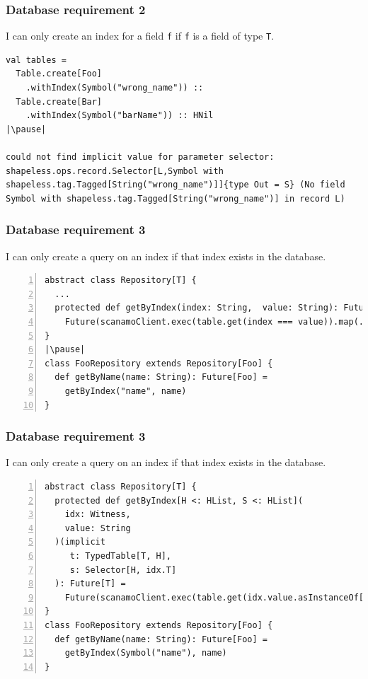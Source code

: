 \documentclass[aspectratio=169]{beamer}
\begin{document}
\begin{frame}[fragile]
\frametitle{Database requirement 2}
I can only create an index for a field \texttt{f} if \texttt{f} is a field of type \texttt{T}.
\hfill \break
\begin{lstlisting}[style=myScalaStyle,frame=none,escapeinside=||]
val tables =
  Table.create[Foo]
    .withIndex(Symbol("wrong_name")) ::
  Table.create[Bar]
    .withIndex(Symbol("barName")) :: HNil
|\pause|

could not find implicit value for parameter selector: shapeless.ops.record.Selector[L,Symbol with shapeless.tag.Tagged[String("wrong_name")]]{type Out = S} (No field Symbol with shapeless.tag.Tagged[String("wrong_name")] in record L)
\end{lstlisting}
\end{frame}

\begin{frame}[fragile]
\frametitle{Database requirement 3}
I can only create a query on an index if that index exists in the database.
\hfill \break
\begin{lstlisting}[style=myScalaStyle,frame=none,escapeinside=||,numbers=left]
abstract class Repository[T] {
  ...
  protected def getByIndex(index: String,  value: String): Future[T] =
    Future(scanamoClient.exec(table.get(index === value)).map(...)
}
|\pause|
class FooRepository extends Repository[Foo] {
  def getByName(name: String): Future[Foo] =
    getByIndex("name", name)
}

\end{lstlisting}
\end{frame}

\begin{frame}[fragile]
\frametitle{Database requirement 3}
I can only create a query on an index if that index exists in the database.
\hfill \break
\begin{lstlisting}[style=myScalaStyle,frame=none,escapeinside=||,numbers=left]
abstract class Repository[T] {
  protected def getByIndex[H <: HList, S <: HList](
    idx: Witness, 
    value: String
  )(implicit
     t: TypedTable[T, H], 
     s: Selector[H, idx.T]
  ): Future[T] =
    Future(scanamoClient.exec(table.get(idx.value.asInstanceOf[Symbol].name === value)))
}
class FooRepository extends Repository[Foo] {
  def getByName(name: String): Future[Foo] =
    getByIndex(Symbol("name"), name)
}

\end{lstlisting}
\end{frame}
\end{document}
